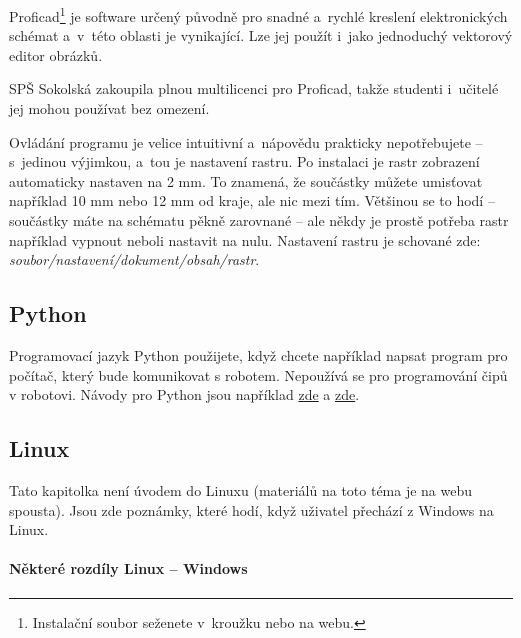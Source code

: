 Proficad\footnote{Instalační soubor seženete v~kroužku nebo na webu.} 
je software určený původně pro snadné a~rychlé kreslení elektronických schémat a~v~této oblasti je vynikající. 
Lze jej použít i~jako jednoduchý vektorový editor obrázků. 

SPŠ Sokolská zakoupila plnou multilicenci pro Proficad, takže studenti i~učitelé jej mohou používat bez omezení. 

Ovládání programu je velice intuitivní a~nápovědu prakticky nepotřebujete -- s~jedinou výjimkou, a~tou je nastavení rastru. 
Po instalaci je rastr zobrazení automaticky nastaven na 2 mm. To znamená, že součástky 
můžete umisťovat například 10 mm nebo 12 mm od kraje, ale nic mezi tím. 
Většinou se to hodí -- součástky máte na schématu pěkně zarovnané -- ale 
někdy je prostě potřeba rastr například vypnout neboli nastavit na nulu. 
Nastavení rastru je schované zde:  {\it soubor/nastavení/dokument/obsah/rastr}.

\subsection{Python}

Programovací jazyk Python použijete, když chcete například napsat program pro počítač, který bude komunikovat s robotem. 
Nepoužívá se pro programování čipů v robotovi. 
Návody pro Python jsou například \href{https://www.sallyx.org/sally/python/}{zde} a  \href{http://diveintopython3.py.cz/index.html}{zde}. 


\subsection{Linux} 

Tato kapitolka není úvodem do Linuxu (materiálů na toto téma je na webu spousta).  Jsou zde poznámky, které hodí, když uživatel přechází z Windows na Linux. 

\paragraph{Některé rozdíly Linux -- Windows}

